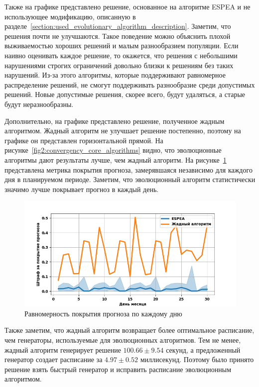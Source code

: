 \documentclass[times,specification,annotation]{itmo-student-thesis}
\begin{document}
Также на графике представлено решение, основанное на алгоритме ESPEA и не использующее модификацию, описанную в разделе~\ref{section:used_evolutionary_algorithm_description}.
Заметим, что решения почти не улучшаются.
Такое поведение можно объяснить плохой выживаемостью хороших решений и малым разнообразием популяции.
Если наивно оценивать каждое решение, то окажется, что решения с небольшими нарушениями строгих ограничений довольно близки к решениям без таких нарушений.
Из-за этого алгоритмы, которые поддерживают равномерное распределение решений, не смогут поддерживать разнообразие среди допустимых решений.
Новые допустимые решения, скорее всего, будут удаляться, а старые будут неразнообразны.

Дополнительно, на графике представлено решение, полученное жадным алгоритмом.
Жадный алгоритм не улучшает решение постепенно, поэтому на графике он представлен горизонтальной прямой.
На рисунке~\ref{fig2:convergency_core_algorithms} видно, что эволюционные алгоритмы дают результаты лучше, чем жадный алгоритм.
На рисунке~\ref{fig2:forecast_cover_by_day} представлена метрика покрытия прогноза, замерявшаяся независимо для каждого дня в планируемом периоде.
Заметим, что эволюционный алгоритм статистически значимо лучше покрывает прогноз в каждый день.

\begin{figure}
\caption{Равномерность покрытия прогноза по каждому дню}\label{fig2:forecast_cover_by_day}
\centering
\includegraphics[width=1\columnwidth]{forecast_uniformity.png}
\end{figure}

Также заметим, что жадный алгоритм возвращает более оптимальное расписание, чем генераторы, используемые для эволюционных алгоритмов.
Тем не менее, жадный алгоритм генерирует решение $100.66 \pm 9.54$ секунд, а предложенный генератор создает расписание за $4.97 \pm 0.52$ миллисекунд.
Поэтому было принято решение взять быстрый генератор и исправить расписание эволюционным алгоритмом.
\end{document}
